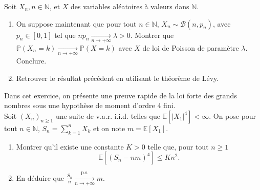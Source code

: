 \smallskip

\begin{mdframed}
\begin{exercice}
Soit $X_n, n \in \mathbb{N}$, et $X$ des variables aléatoires à valeurs dans $\mathbb{N}$.
\begin{enumerate}
    \item On suppose maintenant que pour tout $n \in \mathbb{N}$, $X_n \sim \mathcal{B}(n, p_n)$, avec $p_n \in [0, 1]$ tel que $np_n \xrightarrow[n \to +\infty]{} \lambda > 0$. Montrer que $\mathbb{P}(X_n = k) \xrightarrow[n \to +\infty]{} \mathbb{P}(X = k)$ avec $X$ de loi de Poisson de paramètre $\lambda$. Conclure.
    \item Retrouver le résultat précédent en utilisant le théorème de Lévy.
\end{enumerate}
\end{exercice}
\end{mdframed}

\smallskip

\begin{mdframed}
\begin{exercice}
Dans cet exercice, on présente une preuve rapide de la loi forte des grands nombres sous une hypothèse de moment d'ordre 4 fini.\\
Soit $(X_n)_{n \ge 1}$ une suite de v.a.r. i.i.d. telles que $\mathbb{E}[|X_1|^4] < \infty$. On pose pour tout $n \in \mathbb{N}$, $S_n = \sum_{k=1}^n X_k$ et on note $m = \mathbb{E}[X_1]$.

\begin{enumerate}
    \item Montrer qu'il existe une constante $K > 0$ telle que, pour tout $n \ge 1$
    \begin{equation*}
    \mathbb{E}[(S_n - nm)^4] \le Kn^2.
    \end{equation*}
    \item En déduire que $\frac{S_n}{n} \xrightarrow[n \to +\infty]{\text{p.s.}} m$.
\end{enumerate}
\end{exercice}
\end{mdframed}
